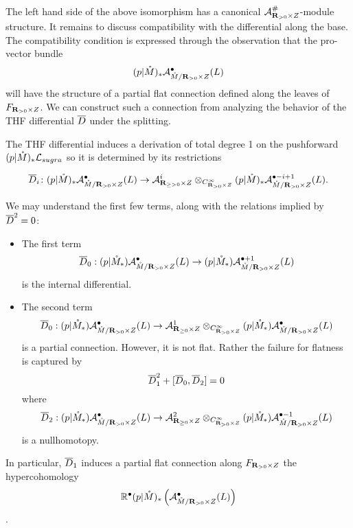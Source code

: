 
The left hand side of the above isomorphism has a canonical $\mathcal A ^{\#}_{\mathbf{R}_{>0}\times Z}$-module structure. 
It remains to discuss compatibility with the differential along the base. The compatibility condition is expressed through the observation that the pro-vector bundle \[(p|\mathring M)_{*} \mathcal A^{\bullet}_{\mathring M/\mathbf{R}_{>0}\times Z}(L)\] will have the structure of a partial flat connection defined along the leaves of $F_{\mathbf{R}_{>0}\times Z}$. We can construct such a connection from analyzing the behavior of the THF differential $\overline{D}$ under the splitting.

 The THF differential induces a derivation of total degree 1 on the pushforward $(p|\mathring M)_{*}\mathcal L_{sugra}$ so it is determined by its restrictions

\[\overline{D}_{i} \colon  (p|\mathring M)_{*} \mathcal A^{\bullet}_{\mathring M/\mathbf{R}_{>0}\times Z}(L) \to \mathcal A^{i}_{\mathbf{R}_{\geq >0} \times Z}\otimes _{C^{\infty}_{\mathbf{R}_{>0}\times Z}}(p|\mathring M)_{*} \mathcal A^{\bullet-i+1}_{\mathring M/\mathbf{R}_{>0}\times Z}(L).\]

We may understand the first few terms, along with the relations implied by $\overline{D}^{2} = 0$:
\begin{itemize}
  \item The first term \[\overline{D}_{0} : (p|\mathring M_{*})\mathcal A^{\bullet}_{\mathring M/\mathbf{R}_{>0}\times Z}(L)\to (p|\mathring M_{*})\mathcal A^{\bullet+1}_{\mathring M/\mathbf{R}_{>0}\times Z}(L)\] is the internal differential.

  \item The second term \[\overline{D}_{0} : (p|\mathring M_{*})\mathcal A^{\bullet}_{\mathring M/\mathbf{R}_{>0}\times Z}(L)\to \mathcal A^{1}_{\mathbf{R}_{\geq 0}\times Z}\otimes _{C^{\infty}_{\mathbf{R}_{>0}\times Z}}(p|\mathring M_{*})\mathcal A^{\bullet}_{\mathring M/\mathbf{R}_{>0}\times Z}(L)\] is a partial connection. However, it is not flat. Rather the failure for flatness is captured by \[ \overline{D}_{1}^{2} + [\overline{D}_{0}, \overline{D}_{2}] = 0 \] where \[ \overline{D}_{2} : (p|\mathring M_{*})\mathcal A^{\bullet}_{\mathring M/\mathbf{R}_{>0}\times Z}(L)\to \mathcal A^{2}_{\mathbf{R}_{\geq 0}\times Z}\otimes _{C^{\infty}_{\mathbf{R}_{>0}\times Z}}(p|\mathring M_{*})\mathcal A^{\bullet-1}_{\mathring M/\mathbf{R}_{>0}\times Z}(L) \] is a nullhomotopy.
\end{itemize}
In particular, $\overline{D}_{1}$ induces a partial flat connection along $F_{\mathbf{R}_{>0}\times Z}$ the hypercohomology \[\mathbb{R}^\bullet (p|\mathring M)_* \left (\mathcal A^\bullet_{\mathring M / \mathbf{R}_{>0}\times Z}(L)\right )\].

